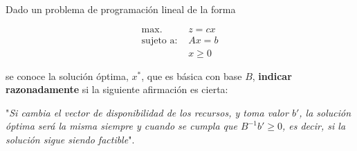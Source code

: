 Dado un problema de programación lineal de la forma 

\begin{align}
    \mbox{max. }&  z =  cx \\
    \mbox{sujeto a: }
    & Ax = b \\
    & x \geq 0
\end{align}

\noindent se conoce la solución óptima, $x^*$, que es básica con base $B$, \textbf{indicar razonadamente} si la siguiente afirmación es cierta:

\noindent "\textit{Si cambia el vector de disponibilidad de los recursos, y toma valor $b'$, la solución óptima será la misma siempre y cuando se cumpla que $B^{-1}b'\geq 0$, es decir, si la solución sigue siendo factible}".